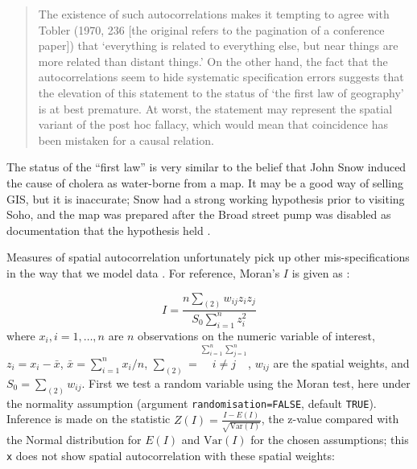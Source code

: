 \documentclass[]{book}
\begin{document}
\begin{quote}
The existence of such autocorrelations makes it tempting to agree with Tobler (1970, 236 {[}the original refers to the pagination of a conference paper{]}) that `everything is related to everything else, but near things are more related than distant things.' On the other hand, the fact that the autocorrelations seem to hide systematic specification errors suggests that the elevation of this statement to the status of `the first law of geography' is at best premature. At worst, the statement may represent the spatial variant of the post hoc fallacy, which would mean that coincidence has been mistaken for a causal relation.
\end{quote}

The status of the ``first law'' is very similar to the belief that John Snow induced the cause of cholera as water-borne from a map. It may be a good way of selling GIS, but it is inaccurate; Snow had a strong working hypothesis prior to visiting Soho, and the map was prepared after the Broad street pump was disabled as documentation that the hypothesis held \citep{BRODY200064}.

Measures of spatial autocorrelation unfortunately pick up other mis-specifications in the way that we model data \citep{schabenberger+gotway:2005, McMillen:2003}. For reference, Moran's \(I\) is given as \citep[page 17]{cliff+ord:81}:

\[
I = \frac{n \sum_{(2)} w_{ij} z_i z_j}{S_0 \sum_{i=1}^{n} z_i^2}
\]
where \(x_i, i=1, \ldots, n\) are \(n\) observations on the numeric variable of interest, \(z_i = x_i - \bar{x}\), \(\bar{x} = \sum_{i=1}^{n} x_i / n\), \(\sum_{(2)} = \stackrel{\sum_{i=1}^{n} \sum_{j=1}^{n}}{i \neq j}\), \(w_{ij}\) are the spatial weights, and \(S_0 = \sum_{(2)} w_{ij}\).
First we test a random variable using the Moran test, here under the normality assumption (argument \texttt{randomisation=FALSE}, default \texttt{TRUE}). Inference is made on the statistic \(Z(I) = \frac{I - E(I)}{\sqrt{\mathrm{Var}(I)}}\), the z-value compared with the Normal distribution for \(E(I)\) and \(\mathrm{Var}(I)\) for the chosen assumptions; this \texttt{x} does not show spatial autocorrelation with these spatial weights:
\end{document}
